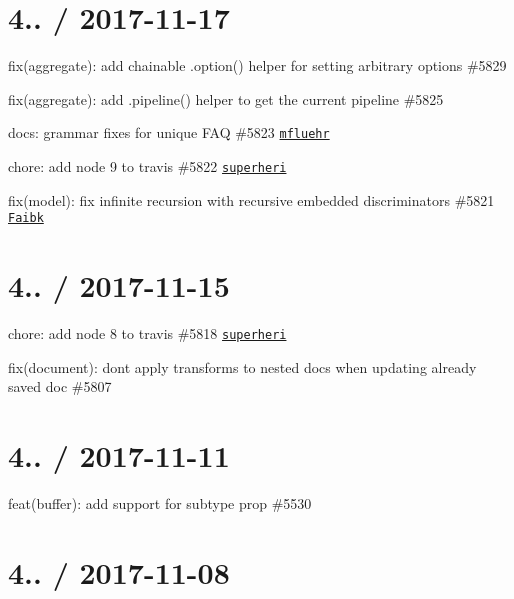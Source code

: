 \section*{4.. / 2017-\/11-\/17 }


\begin{DoxyItemize}
\item fix(aggregate)\+: add chainable .option() helper for setting arbitrary options \#5829
\item fix(aggregate)\+: add {\ttfamily .pipeline()} helper to get the current pipeline \#5825
\item docs\+: grammar fixes for {\ttfamily unique} F\+AQ \#5823 \href{https://github.com/mfluehr}{\tt mfluehr}
\item chore\+: add node 9 to travis \#5822 \href{https://github.com/superheri}{\tt superheri}
\item fix(model)\+: fix infinite recursion with recursive embedded discriminators \#5821 \href{https://github.com/Faibk}{\tt Faibk}
\end{DoxyItemize}

\section*{4.. / 2017-\/11-\/15 }


\begin{DoxyItemize}
\item chore\+: add node 8 to travis \#5818 \href{https://github.com/superheri}{\tt superheri}
\item fix(document)\+: don\textquotesingle{}t apply transforms to nested docs when updating already saved doc \#5807
\end{DoxyItemize}

\section*{4.. / 2017-\/11-\/11 }


\begin{DoxyItemize}
\item feat(buffer)\+: add support for subtype prop \#5530
\end{DoxyItemize}

\section*{4.. / 2017-\/11-\/08 }


